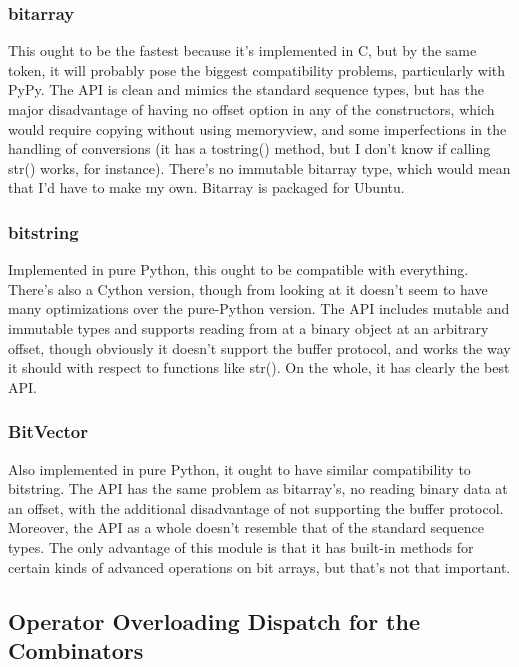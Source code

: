 \documentclass[12pt]{article}
\begin{document}
\subsubsection{bitarray}
\label{sec:bitarray}

This ought to be the fastest because it's implemented in C, but by the
same token, it will probably pose the biggest compatibility problems,
particularly with PyPy.  The API is clean and mimics the standard
sequence types, but has the major disadvantage of having no offset
option in any of the constructors, which would require copying without
using memoryview, and some imperfections in the handling of
conversions (it has a tostring() method, but I don't know if calling
str() works, for instance).  There's no immutable bitarray type, which
would mean that I'd have to make my own.  Bitarray is packaged for
Ubuntu.

\subsubsection{bitstring}
\label{sec:bitstring}

Implemented in pure Python, this ought to be compatible with
everything.  There's also a Cython version, though from looking at it
doesn't seem to have many optimizations over the pure-Python version.
The API includes mutable and immutable types and supports reading from
at a binary object at an arbitrary offset, though obviously it doesn't
support the buffer protocol, and works the way it should with respect
to functions like str().  On the whole, it has clearly the best API.

\subsubsection{BitVector}
\label{sec:bitvector}

Also implemented in pure Python, it ought to have similar
compatibility to bitstring.  The API has the same problem as
bitarray's, no reading binary data at an offset, with the additional
disadvantage of not supporting the buffer protocol.  Moreover, the API
as a whole doesn't resemble that of the standard sequence types.  The
only advantage of this module is that it has built-in methods for
certain kinds of advanced operations on bit arrays, but that's not
that important.


\subsection{Operator Overloading Dispatch for the Combinators}
\label{sec:operator_overloading_dispatch_combinators}
\end{document}
